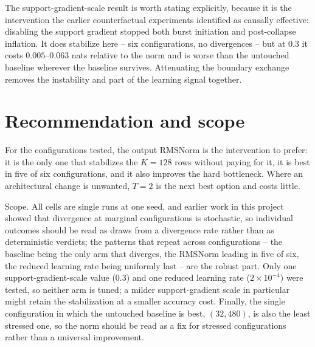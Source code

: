 \documentclass[11pt,a4paper]{article}
\begin{document}
The support-gradient-scale result is worth stating explicitly, because it is the
intervention the earlier counterfactual experiments identified as causally
effective: disabling the support gradient stopped both burst initiation and
post-collapse inflation. It does stabilize here -- six configurations, no
divergences -- but at $0.3$ it costs $0.005$--$0.063$ nats relative to the
norm and is worse than the untouched baseline wherever the baseline
survives. Attenuating the boundary exchange removes the instability and
part of the learning signal together.

\section{Recommendation and scope}

For the configurations tested, the output RMSNorm is the intervention to
prefer: it is the only one that stabilizes the $K=128$ rows without paying
for it, it is best in five of six configurations, and it also improves the
hard bottleneck. Where an architectural change is unwanted, $T=2$ is the
next best option and costs little.

Scope. All cells are single runs at one seed, and earlier work in this
project showed that divergence at marginal configurations is stochastic, so
individual outcomes should be read as draws from a divergence rate rather
than as deterministic verdicts; the patterns that repeat across
configurations -- the baseline being the only arm that diverges, the
RMSNorm leading in five of six, the reduced learning rate being uniformly
last -- are the robust part. Only one support-gradient-scale value ($0.3$) and one
reduced learning rate ($2\times10^{-4}$) were tested, so neither arm is
tuned; a milder support-gradient scale in particular might retain the stabilization
at a smaller accuracy cost. Finally, the single configuration in which the
untouched baseline is best, $(32,480)$, is also the least stressed one, so
the norm should be read as a fix for stressed configurations rather than a
universal improvement.
\end{document}
